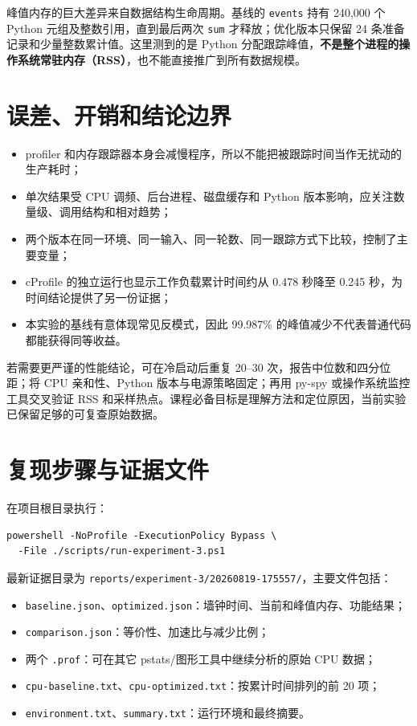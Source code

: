 \documentclass[UTF8,zihao=-4,a4paper]{ctexart}
\newcommand{\code}[1]{\texttt{#1}}
\newcommand{\risk}[1]{\textcolor{CodeRed}{\textbf{#1}}}
\begin{document}
峰值内存的巨大差异来自数据结构生命周期。基线的 \code{events} 持有 240,000 个 Python 元组及整数引用，直到最后两次 \code{sum} 才释放；优化版本只保留 24 条准备记录和少量整数累计值。这里测到的是 Python 分配跟踪峰值，\risk{不是整个进程的操作系统常驻内存（RSS）}，也不能直接推广到所有数据规模。

\section{误差、开销和结论边界}

\begin{itemize}
  \item profiler 和内存跟踪器本身会减慢程序，所以不能把被跟踪时间当作无扰动的生产耗时；
  \item 单次结果受 CPU 调频、后台进程、磁盘缓存和 Python 版本影响，应关注数量级、调用结构和相对趋势；
  \item 两个版本在同一环境、同一输入、同一轮数、同一跟踪方式下比较，控制了主要变量；
  \item cProfile 的独立运行也显示工作负载累计时间约从 0.478 秒降至 0.245 秒，为时间结论提供了另一份证据；
  \item 本实验的基线有意体现常见反模式，因此 99.987\% 的峰值减少不代表普通代码都能获得同等收益。
\end{itemize}

若需要更严谨的性能结论，可在冷启动后重复 20--30 次，报告中位数和四分位距；将 CPU 亲和性、Python 版本与电源策略固定；再用 py-spy 或操作系统监控工具交叉验证 RSS 和采样热点。课程必备目标是理解方法和定位原因，当前实验已保留足够的可复查原始数据。

\section{复现步骤与证据文件}

在项目根目录执行：

\begin{lstlisting}[style=shellstyle]
powershell -NoProfile -ExecutionPolicy Bypass \
  -File ./scripts/run-experiment-3.ps1
\end{lstlisting}

最新证据目录为 \code{reports/experiment-3/20260819-175557/}，主要文件包括：

\begin{itemize}
  \item \code{baseline.json}、\code{optimized.json}：墙钟时间、当前和峰值内存、功能结果；
  \item \code{comparison.json}：等价性、加速比与减少比例；
  \item 两个 \code{.prof}：可在其它 pstats/图形工具中继续分析的原始 CPU 数据；
  \item \code{cpu-baseline.txt}、\code{cpu-optimized.txt}：按累计时间排列的前 20 项；
  \item \code{environment.txt}、\code{summary.txt}：运行环境和最终摘要。
\end{itemize}
\end{document}

